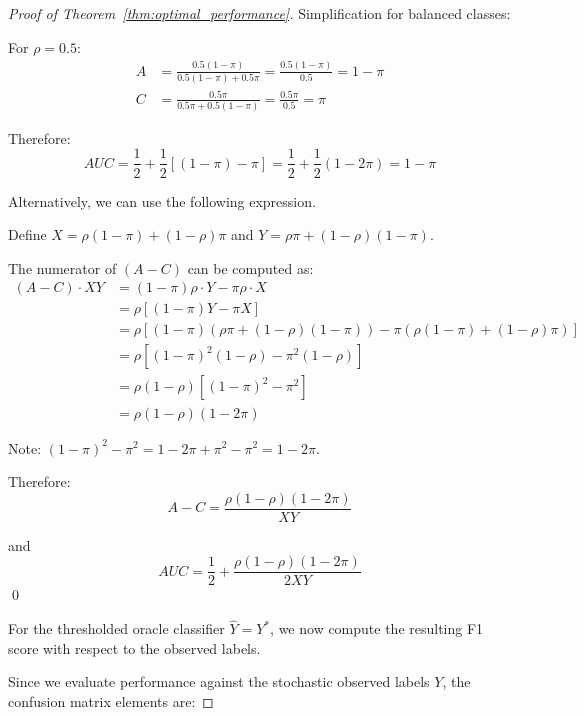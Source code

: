\documentclass{article}
\theoremstyle{plain}
\theoremstyle{definition}
\theoremstyle{remark}
\begin{document}
\begin{proof}[Proof of Theorem~\ref{thm:optimal_performance}]
Simplification for balanced classes:

For $\rho = 0.5$:
\begin{align}
A &= \frac{0.5(1-\pi)}{0.5(1-\pi) + 0.5\pi} = \frac{0.5(1-\pi)}{0.5} = 1-\pi \\
C &= \frac{0.5\pi}{0.5\pi + 0.5(1-\pi)} = \frac{0.5\pi}{0.5} = \pi
\end{align}

Therefore:
\begin{equation}
AUC = \frac{1}{2} + \frac{1}{2}[(1-\pi) - \pi] = \frac{1}{2} + \frac{1}{2}(1-2\pi) = 1 - \pi
\end{equation}

Alternatively, we can use the following expression.

Define $X = \rho(1-\pi) + (1-\rho)\pi$ and $Y = \rho \pi + (1-\rho)(1-\pi)$.

The numerator of $(A - C)$ can be computed as:
\begin{align}
(A - C) \cdot XY &= (1-\pi)\rho \cdot Y - \pi\rho \cdot X \\
&= \rho[(1-\pi)Y - \pi X] \\
&= \rho[(1-\pi)(\rho \pi + (1-\rho)(1-\pi)) - \pi(\rho(1-\pi) + (1-\rho)\pi)] \\
&= \rho[(1-\pi)^2(1-\rho) - \pi^2(1-\rho)] \\
&= \rho(1-\rho)[(1-\pi)^2 - \pi^2] \\
&= \rho(1-\rho)(1-2\pi)
\end{align}

Note: $(1-\pi)^2 - \pi^2 = 1 - 2\pi + \pi^2 - \pi^2 = 1 - 2\pi$.

Therefore:
\begin{equation}
A - C = \frac{\rho(1-\rho)(1-2\pi)}{XY}
\end{equation}

and
\begin{equation}
AUC = \frac{1}{2} + \frac{\rho(1-\rho)(1-2\pi)}{2XY}
\end{equation}
\qed

For the thresholded oracle classifier $\widehat{Y}=Y^{*}$, we now compute the resulting F1 score with respect to the observed labels.

Since we evaluate performance against the stochastic observed labels $Y$, the confusion matrix elements are:


\end{proof}
\end{document}
